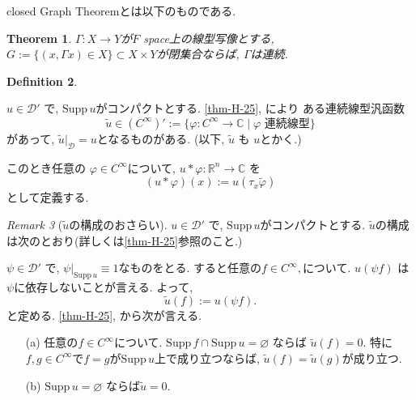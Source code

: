 \documentclass[dvipdfmx,a4paper,11pt]{article} %
\newtheorem{thm}{Theorem}[section]
\theoremstyle{definition}
\newtheorem{defn}[thm]{Definition}
\theoremstyle{remark}
\newtheorem{rem}[thm]{Remark}
\numberwithin{equation}{section}
\newcommand{\C}{\mathbb{C}}
\begin{document}
closed Graph Theoremとは以下のものである.
\begin{tcolorbox}[mybox]
\begin{thm}\cite[Theorem 2.15]{Rud}
\label{thm-H-closedgraph}
$\Gamma : X \to Y$が$F$ space上の線型写像とする,
$G:= \{ (x, \Gamma x) \in X\} \subset X \times Y$が閉集合ならば, $\Gamma$は連続. 
\end{thm}
\end{tcolorbox}






\begin{tcolorbox}[mybox]
\begin{defn}\cite[Definition 6.34]{Rud}
\label{defn-H-3.1}

\( u \in \mathcal{D}' \) で,  \(\mathrm{Supp}\, u \)がコンパクトとする. 
\ref{thm-H-25}, \cite[Theorem 6.32]{Rud}により
ある連続線型汎函数
\[
\widetilde{u} \in (C^\infty)':= \{\varphi : C^{\infty} \to \C \mid \text{$\varphi$ 連続線型} \}
\]
があって,   \( \widetilde{u}|_{\mathcal{D}} = u\)となるものがある. 
(以下, \(\widetilde{u}\) も \(u\)とかく.)

このとき任意の
\( \varphi \in C^\infty \)について,  \( u \ast \varphi : \mathbb{R}^n \to \mathbb{C} \) を
\[
 (u \ast \varphi)(x) := u(\tau_x \widetilde{\varphi}) 
\]
として定義する. 
\end{defn}
\end{tcolorbox}

\begin{rem}[\(\widetilde{u}\)の構成のおさらい]
\label{rem-H-3.2}
\( u \in \mathcal{D}' \) で,  \(\mathrm{Supp}\, u \)がコンパクトとする. 
\(\widetilde{u}\)の構成は次のとおり(詳しくは\ref{thm-H-25}参照のこと.)

 \(\psi \in \mathcal{D}'\) で, \(\psi|_{\mathrm{Supp}\, u} \equiv 1\)なものをとる.
すると任意の\( f \in C^\infty,\)について. \(u(\psi f)\) は \(\psi\)に依存しないことが言える.
よって,  
\[
\widetilde{u}(f) := u(\psi f).
\]
と定める. \ref{thm-H-25}, \cite[Theorem 6.32]{Rud} から次が言える.

\begin{itemize}
\item[(a)] 任意の\( f \in C^\infty\)について.  \(\mathrm{Supp}\, f \cap \mathrm{Supp}\, u = \varnothing\) ならば \(\widetilde{u}(f) = 0.\)
特に\(f, g \in C^\infty\)で\( f = g \)が\(\mathrm{Supp}\, u\)上で成り立つならば, 
\(\widetilde{u}(f) = \widetilde{u}(g)\)が成り立つ.
\item[(b)] \(\mathrm{Supp}\, u = \varnothing\) ならば\(\widetilde{u} = 0.\)
\end{itemize}
\end{rem}
\end{document}
